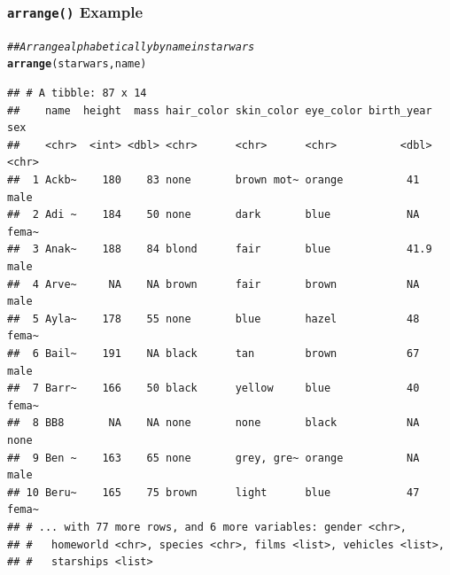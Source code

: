 \documentclass{beamer}\usepackage[]{graphicx}\usepackage[]{color}
\makeatletter
\newcommand{\hlcom}[1]{\textcolor[rgb]{0.678,0.584,0.686}{\textit{#1}}}%
\newcommand{\hlstd}[1]{\textcolor[rgb]{0.345,0.345,0.345}{#1}}%
\newcommand{\hlkwd}[1]{\textcolor[rgb]{0.737,0.353,0.396}{\textbf{#1}}}%
\newenvironment{kframe}{%
 \def\at@end@of@kframe{}%
 \ifinner\ifhmode%
  \def\at@end@of@kframe{\end{minipage}}%
  \begin{minipage}{\columnwidth}%
 \fi\fi%
 \def\FrameCommand##1{\hskip\@totalleftmargin \hskip-\fboxsep
 \colorbox{shadecolor}{##1}\hskip-\fboxsep
     \hskip-\linewidth \hskip-\@totalleftmargin \hskip\columnwidth}%
 \MakeFramed {\advance\hsize-\width
   \@totalleftmargin\z@ \linewidth\hsize
   \@setminipage}}%
 {\par\unskip\endMakeFramed%
 \at@end@of@kframe}
\newenvironment{knitrout}{}{} %
\makeatother
\begin{document}
\begin{frame}[fragile]\frametitle{\texttt{arrange()} Example}
\begin{knitrout}\footnotesize
{}\color{fgcolor}\begin{kframe}
\begin{alltt}
\hlcom{## Arrange alphabetically by name in starwars}
\hlkwd{arrange}\hlstd{(starwars, name)}
\end{alltt}
\begin{verbatim}
## # A tibble: 87 x 14
##    name  height  mass hair_color skin_color eye_color birth_year sex  
##    <chr>  <int> <dbl> <chr>      <chr>      <chr>          <dbl> <chr>
##  1 Ackb~    180    83 none       brown mot~ orange          41   male 
##  2 Adi ~    184    50 none       dark       blue            NA   fema~
##  3 Anak~    188    84 blond      fair       blue            41.9 male 
##  4 Arve~     NA    NA brown      fair       brown           NA   male 
##  5 Ayla~    178    55 none       blue       hazel           48   fema~
##  6 Bail~    191    NA black      tan        brown           67   male 
##  7 Barr~    166    50 black      yellow     blue            40   fema~
##  8 BB8       NA    NA none       none       black           NA   none 
##  9 Ben ~    163    65 none       grey, gre~ orange          NA   male 
## 10 Beru~    165    75 brown      light      blue            47   fema~
## # ... with 77 more rows, and 6 more variables: gender <chr>,
## #   homeworld <chr>, species <chr>, films <list>, vehicles <list>,
## #   starships <list>
\end{verbatim}
\end{kframe}
\end{knitrout}
\end{frame}
\end{document}
